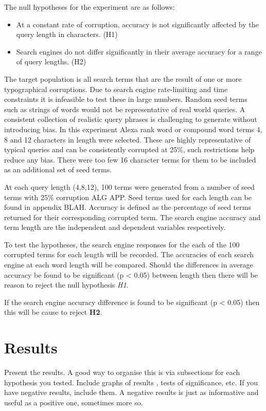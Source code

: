 \documentclass{csfourzero}
\begin{document}
The null hypotheses for the experiment are as follows:
\begin{itemize}
  \item{At a constant rate of corruption, accuracy is not significantly affected by the query length in characters. (H1)}
  \item{Search engines do not differ significantly in their average accuracy for a range of query lengths. (H2)}
\end{itemize}

The target population is all search terms that are the result of one or more typographical corruptions. Due to search engine rate-limiting and time constraints it is infeasible to test these in large numbers. Random seed terms such as strings of words would not be representative of real world queries. A consistent collection of realistic query phrases is challenging to generate without introducing bias. In this experiment Alexa rank word or compound word terms 4, 8 and 12 characters in length were selected. These are highly representative of typical queries and can be consistently corrupted at 25\%, such restrictions help reduce any bias. There were too few 16 character terms for them to be included as an additional set of seed terms.

At each query length (4,8,12), 100 terms were generated from a number of seed terms with 25\% corruption ALG APP. Seed terms used for each length can be found in appendix BLAH. Accuracy is defined as the percentage of seed terms returned for their corresponding corrupted term. The search engine accuracy and term length are the independent and dependent variables respectively.

To test the hypotheses, the search engine responses for the each of the 100 corrupted terms for each length will be recorded. The accuracies of each search engine at each word length will be compared. Should the differences in average accuracy be found to be significant (p < 0.05) between length then there will be reason to reject the null hypothesis \textit{H1}.

If the search engine accuracy difference is found to be significant (p < 0.05) then this will be cause to reject \textbf{H2}.


\section{Results}
\label{sec:results}

Present the results. A good way to organise this is via subsections
for each hypothesis you tested. Include graphs of results
, tests of significance, etc. If you have
negative results, include them. A negative results is just as
informative and useful as a positive one, sometimes more so.
\end{document}
